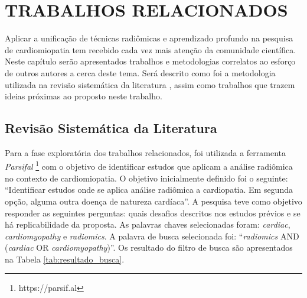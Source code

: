 \chapter{TRABALHOS RELACIONADOS} 
\label{chap:trab_relacionados}


Aplicar a unificação de técnicas radiômicas e aprendizado profundo na pesquisa de cardiomiopatia tem recebido cada vez mais atenção da comunidade científica.
Neste capítulo serão apresentados trabalhos e metodologias correlatos ao esforço de outros autores a cerca deste tema. Será descrito como foi a metodologia utilizada na revisão sistemática da literatura \cite{petersenGuidelinesConductingSystematic2015a}, assim como trabalhos que trazem ideias próximas ao proposto neste trabalho.

\section{Revisão Sistemática da Literatura} 
\label{sec:rev_sistematica}

Para a fase exploratória dos trabalhos relacionados, foi utilizada a ferramenta \textit{Parsifal} \footnote{https://parsif.al} com o objetivo de identificar estudos que aplicam a análise radiômica no contexto de cardiomiopatia. O objetivo inicialmente definido foi o seguinte: ``Identificar estudos onde se aplica análise radiômica a cardiopatia. Em segunda opção, alguma outra doença de natureza cardíaca''. A pesquisa teve como objetivo responder as seguintes perguntas: quais desafios descritos nos estudos prévios e se há replicabilidade da proposta. As palavras chaves selecionadas foram: \textit{cardiac}, \textit{cardiomyopathy} e \textit{radiomics}. A palavra de busca selecionada foi: ``\textit{radiomics} AND (\textit{cardiac} OR \textit{cardiomyopathy})''. Os resultado do filtro de busca são apresentados na Tabela \ref{tab:resultado_busca}. 
\newline

